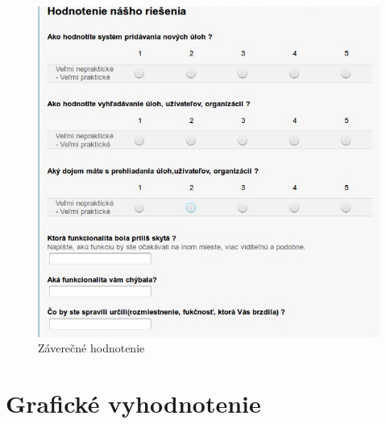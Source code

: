 {{\begin{figure}[htb]
\begin{center}
\end{center}

\end{figure}

\begin{figure}[htb]

\begin{center}

\includegraphics[scale=0.5]{dotaz3.jpg} 
\caption{Záverečné hodnotenie}


\end{center}

\end{figure}

	}


	\section{Grafické vyhodnotenie}
	{


	}


}


